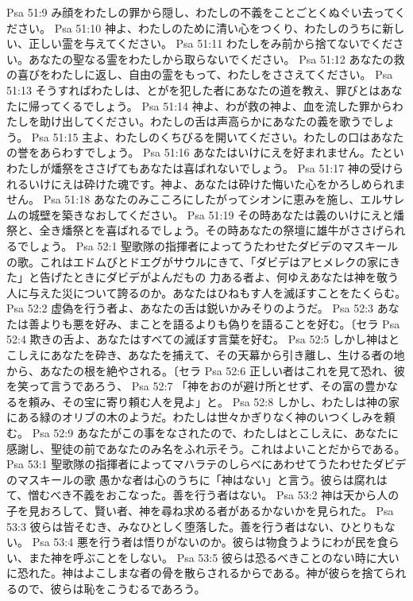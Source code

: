 Psa 51:9  み顔をわたしの罪から隠し、わたしの不義をことごとくぬぐい去ってください。
Psa 51:10  神よ、わたしのために清い心をつくり、わたしのうちに新しい、正しい霊を与えてください。
Psa 51:11  わたしをみ前から捨てないでください。あなたの聖なる霊をわたしから取らないでください。
Psa 51:12  あなたの救の喜びをわたしに返し、自由の霊をもって、わたしをささえてください。
Psa 51:13  そうすればわたしは、とがを犯した者にあなたの道を教え、罪びとはあなたに帰ってくるでしょう。
Psa 51:14  神よ、わが救の神よ、血を流した罪からわたしを助け出してください。わたしの舌は声高らかにあなたの義を歌うでしょう。
Psa 51:15  主よ、わたしのくちびるを開いてください。わたしの口はあなたの誉をあらわすでしょう。
Psa 51:16  あなたはいけにえを好まれません。たといわたしが燔祭をささげてもあなたは喜ばれないでしょう。
Psa 51:17  神の受けられるいけにえは砕けた魂です。神よ、あなたは砕けた悔いた心をかろしめられません。
Psa 51:18  あなたのみこころにしたがってシオンに恵みを施し、エルサレムの城壁を築きなおしてください。
Psa 51:19  その時あなたは義のいけにえと燔祭と、全き燔祭とを喜ばれるでしょう。その時あなたの祭壇に雄牛がささげられるでしょう。
Psa 52:1  聖歌隊の指揮者によってうたわせたダビデのマスキールの歌。これはエドムびとドエグがサウルにきて、「ダビデはアヒメレクの家にきた」と告げたときにダビデがよんだもの 力ある者よ、何ゆえあなたは神を敬う人に与えた災について誇るのか。あなたはひねもす人を滅ぼすことをたくらむ。
Psa 52:2  虚偽を行う者よ、あなたの舌は鋭いかみそりのようだ。
Psa 52:3  あなたは善よりも悪を好み、まことを語るよりも偽りを語ることを好む。〔セラ
Psa 52:4  欺きの舌よ、あなたはすべての滅ぼす言葉を好む。
Psa 52:5  しかし神はとこしえにあなたを砕き、あなたを捕えて、その天幕から引き離し、生ける者の地から、あなたの根を絶やされる。〔セラ
Psa 52:6  正しい者はこれを見て恐れ、彼を笑って言うであろう、
Psa 52:7  「神をおのが避け所とせず、その富の豊かなるを頼み、その宝に寄り頼む人を見よ」と。
Psa 52:8  しかし、わたしは神の家にある緑のオリブの木のようだ。わたしは世々かぎりなく神のいつくしみを頼む。
Psa 52:9  あなたがこの事をなされたので、わたしはとこしえに、あなたに感謝し、聖徒の前であなたのみ名をふれ示そう。これはよいことだからである。
Psa 53:1  聖歌隊の指揮者によってマハラテのしらべにあわせてうたわせたダビデのマスキールの歌 愚かな者は心のうちに「神はない」と言う。彼らは腐れはて、憎むべき不義をおこなった。善を行う者はない。
Psa 53:2  神は天から人の子を見おろして、賢い者、神を尋ね求める者があるかないかを見られた。
Psa 53:3  彼らは皆そむき、みなひとしく堕落した。善を行う者はない、ひとりもない。
Psa 53:4  悪を行う者は悟りがないのか。彼らは物食うようにわが民を食らい、また神を呼ぶことをしない。
Psa 53:5  彼らは恐るべきことのない時に大いに恐れた。神はよこしまな者の骨を散らされるからである。神が彼らを捨てられるので、彼らは恥をこうむるであろう。
